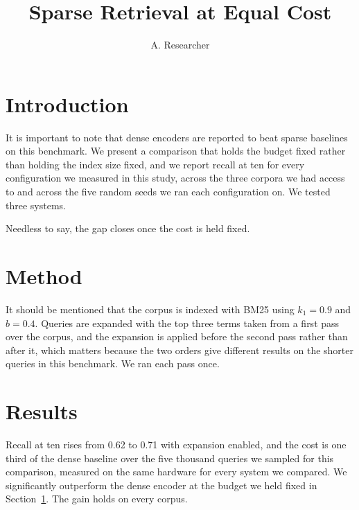 \documentclass{article}
\title{Sparse Retrieval at Equal Cost}
\author{A. Researcher}
\begin{document}
\maketitle

\section{Introduction}
\label{sec:intro}

It is important to note that dense encoders are reported to beat sparse
baselines on this benchmark. We present a comparison that holds the budget
fixed rather than holding the index size fixed, and we report recall at ten
for every configuration we measured in this study, across the three corpora we
had access to and across the five random seeds we ran each configuration on.
We tested three systems.

Needless to say, the gap closes once the cost is held fixed.

\section{Method}

It should be mentioned that the corpus is indexed with BM25 using
$k_1 = 0.9$ and $b = 0.4$.
Queries are expanded with the top three terms taken from a first pass over the
corpus, and the expansion is applied before the second pass rather than after
it, which matters because the two orders give different results on the shorter
queries in this benchmark.
We ran each pass once.

\section{Results}

Recall at ten rises from 0.62 to 0.71 with expansion enabled, and the cost is
one third of the dense baseline over the five thousand queries we sampled for
this comparison, measured on the same hardware for every system we compared.
We significantly outperform the dense encoder at the budget we held fixed in
Section~\ref{sec:intro}.
The gain holds on every corpus.
\end{document}
